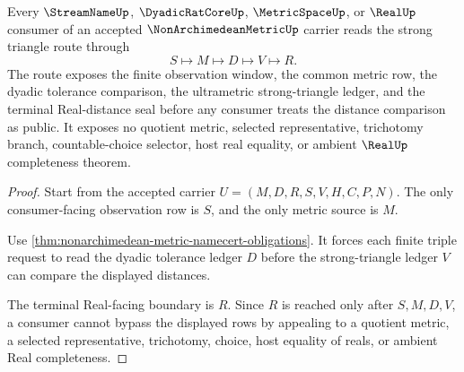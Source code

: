 \begin{theorem}
\label{thm:nonarchimedean-metric-ultrametric-triangle-route}
Every $\StreamNameUp$, $\DyadicRatCoreUp$, $\MetricSpaceUp$, or $\RealUp$ consumer of an accepted $\NonArchimedeanMetricUp$ carrier reads the strong triangle route through
$$
S \longmapsto M \longmapsto D \longmapsto V \longmapsto R .
$$
The route exposes the finite observation window, the common metric row, the dyadic tolerance comparison, the ultrametric strong-triangle ledger, and the terminal Real-distance seal before any consumer treats the distance comparison as public. It exposes no quotient metric, selected representative, trichotomy branch, countable-choice selector, host real equality, or ambient $\RealUp$ completeness theorem.
\end{theorem}
\begin{proof}
Start from the accepted carrier $U=(M,D,R,S,V,H,C,P,N)$. The only consumer-facing observation row is $S$, and the only metric source is $M$.

Use \autoref{thm:nonarchimedean-metric-namecert-obligations}. It forces each finite triple request to read the dyadic tolerance ledger $D$ before the strong-triangle ledger $V$ can compare the displayed distances.

The terminal Real-facing boundary is $R$. Since $R$ is reached only after $S,M,D,V$, a consumer cannot bypass the displayed rows by appealing to a quotient metric, a selected representative, trichotomy, choice, host equality of reals, or ambient Real completeness.
\end{proof}


\begin{closurestatus}{\NonArchimedeanMetricUp}
  \theoryclosure{\seedClosure}
  \formalstatus{\unformalizedV}
\end{closurestatus}
